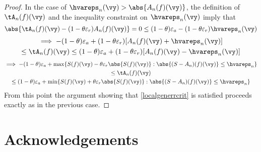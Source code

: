 \documentclass[]{elsarticle}
\theoremstyle{definition}
\theoremstyle{remark}
\begin{document}
\begin{proof}
In the case of $\hvareps_n(\vy) > \abs{A_n(f)(\vy)}$, the definition of $\tA_n(f)(\vy)$ and the inequality constraint on $\hvareps_n(\vy)$ imply that
\begin{equation*}
\abs{\tA_n(f)(\vy) - (1 - \theta \varepsilon_r) A_n(f)(\vy)}= 0 \le (1-\theta)\varepsilon_a - (1-\theta \varepsilon_r) \hvareps_n(\vy)
\end{equation*}
\begin{multline*}
\implies -(1-\theta)\varepsilon_a + (1 - \theta \varepsilon_r) [A_n(f)(\vy) + \hvareps_n(\vy)] \\
\le  \tA_n(f)(\vy) \le (1-\theta)\varepsilon_a + (1 - \theta \varepsilon_r) [A_n(f)(\vy) - \hvareps_n(\vy)]
\end{multline*}
\begin{multline*}
\implies -(1-\theta)\varepsilon_a + \max\{S(f)(\vy) - \theta \varepsilon_r\abs{S(f)(\vy)} : \abs{(S-A_n)(f) (\vy)} \le \hvareps_n\} \\
\le  \tA_n(f)(\vy) \\
 \le (1-\theta)\varepsilon_a + \min\{S(f)(\vy) + \theta \varepsilon_r\abs{S(f)(\vy)} : \abs{(S-A_n)(f) (\vy)} \le \hvareps_n\}
\end{multline*}
From this point the argument showing that \eqref{localgenerrcrit} is satisfied proceeds exactly as in the previous case.
\end{proof}




\section*{Acknowledgements} 



\end{document}
